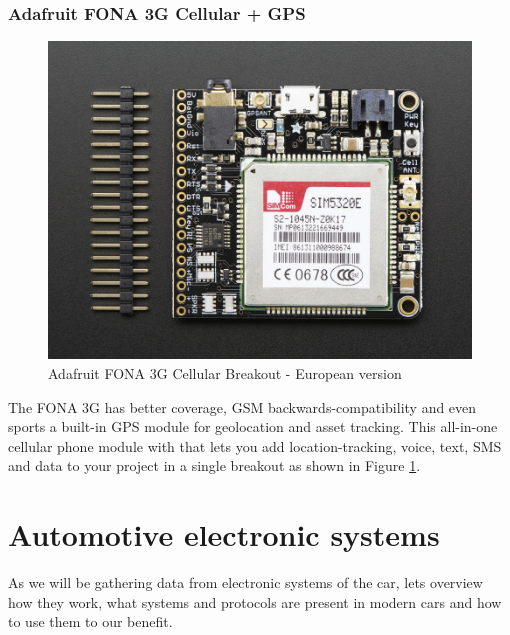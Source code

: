 \subsubsection{Adafruit FONA 3G Cellular + GPS} %
\label{ssub:adafruit_fona_3g_cellular_gps}
\begin{figure}[H]
\begin{center}
\captionsetup{font=small}
\includegraphics[scale=0.85]{pics/3g.jpg}
\caption{Adafruit FONA 3G Cellular Breakout - European version}
\label{fig:3g}
\end{center}
\end{figure}
The FONA 3G has better coverage, GSM backwards-compatibility and even sports a built-in GPS module for geolocation and asset tracking. This all-in-one cellular phone module with that lets you add location-tracking, voice, text, SMS and data to your project in a single breakout as shown in Figure \ref{fig:3g}.\cite{ada_3g}


\section{Automotive electronic systems}
As we will be gathering data from electronic systems of the car, lets overview how they work, what systems and protocols are present in modern cars and how to use them to our benefit.
